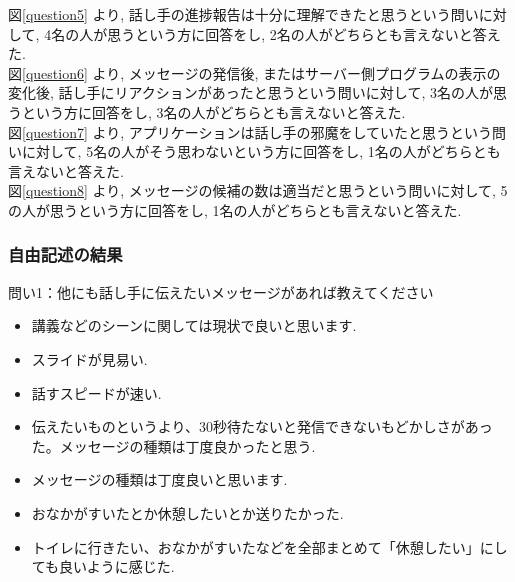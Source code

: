 \documentclass{funthesis}
\begin{document}
図\ref{question5} より, 話し手の進捗報告は十分に理解できたと思うという問いに対して, 4名の人が思うという方に回答をし, 2名の人がどちらとも言えないと答えた. \\

図\ref{question6} より, メッセージの発信後, またはサーバー側プログラムの表示の変化後, 話し手にリアクションがあったと思うという問いに対して, 3名の人が思うという方に回答をし, 3名の人がどちらとも言えないと答えた. \\

図\ref{question7} より, アプリケーションは話し手の邪魔をしていたと思うという問いに対して, 5名の人がそう思わないという方に回答をし, 1名の人がどちらとも言えないと答えた. \\

図\ref{question8} より, メッセージの候補の数は適当だと思うという問いに対して, 5の人が思うという方に回答をし, 1名の人がどちらとも言えないと答えた. \\

\subsubsection{自由記述の結果}

問い1：他にも話し手に伝えたいメッセージがあれば教えてください\\

\begin{itemize}
 \item 講義などのシーンに関しては現状で良いと思います.\\
 \item スライドが見易い.\\
 \item 話すスピードが速い.\\
 \item 伝えたいものというより、30秒待たないと発信できないもどかしさがあった。メッセージの種類は丁度良かったと思う.\\
 \item メッセージの種類は丁度良いと思います.\\
 \item おなかがすいたとか休憩したいとか送りたかった.\\
 \item トイレに行きたい、おなかがすいたなどを全部まとめて「休憩したい」にしても良いように感じた.\\
\end{itemize}
\end{document}

